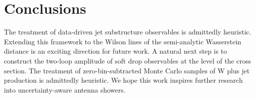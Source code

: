 \section{Conclusions}\label{sec:conclusions}

The treatment of data-driven jet substructure observables is admittedly
heuristic. Extending this framework to the Wilson lines of the
semi-analytic Wasserstein distance is an exciting direction for future
work. A natural next step is to construct the two-loop amplitude of soft
drop observables at the level of the cross section. The treatment of
zero-bin-subtracted Monte Carlo samples of W plus jet production is
admittedly heuristic. We hope this work inspires further research into
uncertainty-aware antenna showers.

